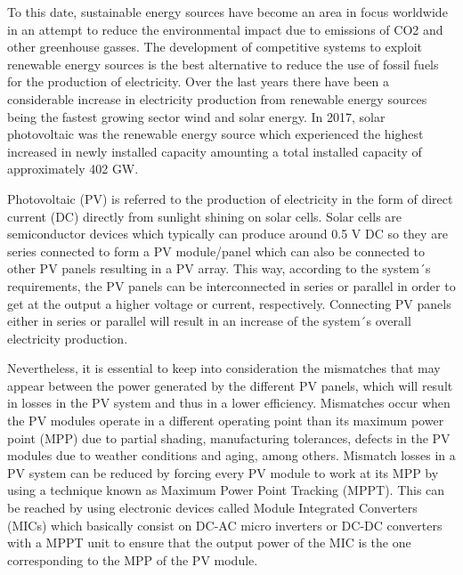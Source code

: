 
To this date, sustainable energy sources have become an area in focus worldwide in an attempt to reduce the environmental impact due to emissions of CO2 and other greenhouse gasses. The development of competitive systems to exploit renewable energy sources is the best alternative to reduce the use of fossil fuels for the production of electricity. Over the last years there have been a considerable increase in electricity production from renewable energy sources being the fastest growing sector wind and solar energy. In 2017, solar photovoltaic was the renewable energy source which experienced the highest increased in newly installed capacity amounting a total installed capacity of approximately 402 GW. %

Photovoltaic (PV) is referred to the production of electricity in the form of direct current (DC) directly from sunlight shining on solar cells. Solar cells are semiconductor devices which typically can produce around 0.5 V DC so they are series connected to form a PV module/panel which can also be connected to other PV panels resulting in a PV array. This way, according to the system´s requirements, the PV panels can be interconnected in series or parallel in order to get at the output a higher voltage or current, respectively. Connecting PV panels either in series or parallel will result in an increase of the system´s overall electricity production. %

Nevertheless, it is essential to keep into consideration the mismatches that may appear between the power generated by the different PV panels, which will result in losses in the PV system and thus in a lower efficiency. Mismatches occur when the PV modules operate in a different operating point than its maximum power point (MPP) due to partial shading, manufacturing tolerances, defects in the PV modules due to weather conditions and aging, among others. Mismatch losses in a PV system can be reduced by forcing every PV module to work at its MPP by using a technique known as Maximum Power Point Tracking (MPPT). This can be reached by using electronic devices called Module Integrated Converters (MICs) which basically consist on DC-AC micro inverters or DC-DC converters with a MPPT unit to ensure that the output power of the MIC is the one corresponding to the MPP of the PV module.%

